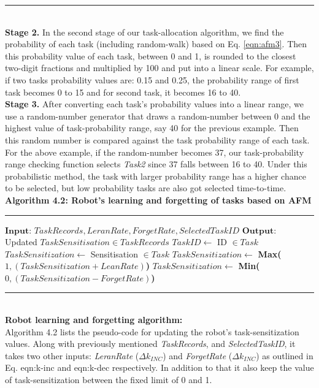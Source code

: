 \documentclass[preprint,12pt]{elsarticle}
\newcommand{\HRule}{\rule{\linewidth}{0.3mm}}
\begin{document}
\vspace{-3mm} 
\HRule\\
\textbf{Stage 2.} In the second stage of our task-allocation algorithm, we  find the probability of each task (including random-walk) based on Eq. \ref{eqn:afm3}. Then this probability value of each task, between 0 and 1, is rounded to the closest two-digit fractions and multiplied by 100 and put into a linear scale. For example, if two tasks probability values are: 0.15 and  0.25, the probability range of first  task becomes 0 to 15 and for second task, it becomes 16 to 40.\\
\textbf{Stage 3.} After converting each task's probability values into a linear range, we use a random-number generator that draws a random-number between 0 and the highest value of task-probability range, say 40 for the previous example. Then this random number is compared against the task probability range of each task. For the above example, if the random-number becomes 37, our task-probability range checking function selects \textit{Task2} since 37 falls between 16 to 40. Under this probabilistic method, the task with larger probability range has a  higher chance to be selected, but low probability tasks are also got selected time-to-time.
\newline
\textbf{Algorithm 4.2: Robot's learning and forgetting of tasks based on AFM}
\vspace{-3mm}
\newline
\HRule
\begin{algorithmic}[1]
\begin{small}
\label{alg:update-sz}
\State $\textbf{Input: }  TaskRecords, LeranRate, ForgetRate, SelectedTaskID$
\State $\textbf{Output: }$ Updated $TaskSensitisation \in TaskRecords$
\State $ TaskID \gets  $ ID $\in Task$
\State $ TaskSensitization \gets  $   Sensitisation $ \in Task$
\State $ TaskSensitization \gets $ \textbf{Max(}$1, (TaskSensitization + LeanRate)$\textbf{)}
\Else
\State $ TaskSensitization \gets $ \textbf{Min(}$0, (TaskSensitization - ForgetRate)$\textbf{)}
\EndIf
\EndFor
\end{small}
\end{algorithmic}
\vspace{-3mm} 
\HRule\\
\textbf{Robot learning and forgetting algorithm:}\\
Algorithm 4.2 lists the pseudo-code for updating the robot's task-sensitization values. Along with previously mentioned \textit{TaskRecords}, and  \textit{SelectedTaskID}, it takes two other inputs: \textit{LeranRate} ($\Delta k_{INC} $) and \textit{ForgetRate} ($\Delta k_{INC} $) as outlined in Eq. {eqn:k-inc} and {eqn:k-dec} respectively.  In addition to that it also keep the value of task-sensitization between the fixed limit of 0 and 1.
\end{document}
